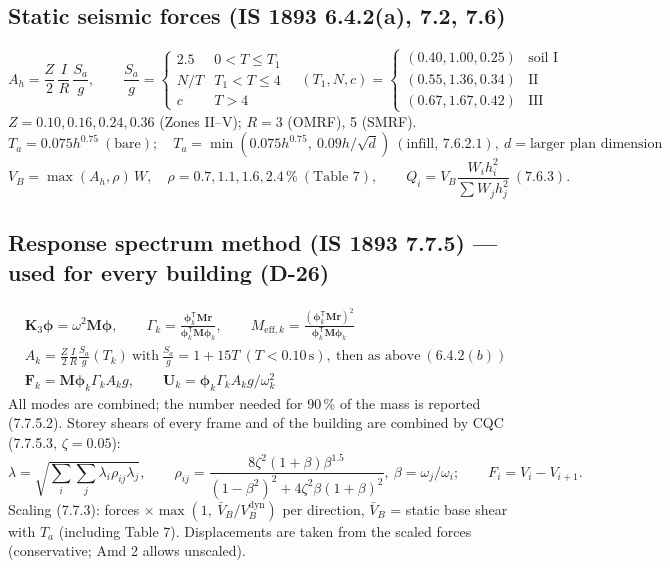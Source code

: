 \documentclass[10pt,a4paper]{article}
\begin{document}
\subsection{Static seismic forces (IS 1893 6.4.2(a), 7.2, 7.6)}
\[
A_h=\frac{Z}{2}\,\frac{I}{R}\,\frac{S_a}{g},\qquad
\frac{S_a}{g}=\begin{cases}2.5 & 0<T\le T_1\\ N/T & T_1<T\le4\\ c & T>4\end{cases}
\quad (T_1,N,c)=\begin{cases}(0.40,1.00,0.25)& \text{soil I}\\(0.55,1.36,0.34)&\text{II}\\(0.67,1.67,0.42)&\text{III}\end{cases}
\]
$Z = 0.10,0.16,0.24,0.36$ (Zones II--V); $R=3$ (OMRF), 5 (SMRF).
\[
T_a=0.075h^{0.75}\ (\text{bare});\quad T_a=\min\!\left(0.075h^{0.75},\ 0.09h/\sqrt d\right)\ (\text{infill, 7.6.2.1}),
\ d=\text{larger plan dimension}
\]
\[
V_B=\max(A_h,\rho)\,W,\quad \rho=0.7,1.1,1.6,2.4\,\%\ (\text{Table 7}),\qquad
Q_i=V_B\frac{W_ih_i^2}{\sum W_jh_j^2}\ (7.6.3).
\]

\subsection{Response spectrum method (IS 1893 7.7.5) --- used for every building (D-26)}
\begin{align*}
&\mathbf K_3\boldsymbol\phi=\omega^2\mathbf M\boldsymbol\phi, \qquad
\Gamma_k=\frac{\boldsymbol\phi_k^{\mathsf T}\mathbf M\mathbf r}{\boldsymbol\phi_k^{\mathsf T}\mathbf M\boldsymbol\phi_k},
\qquad M_{\text{eff},k}=\frac{(\boldsymbol\phi_k^{\mathsf T}\mathbf M\mathbf r)^2}{\boldsymbol\phi_k^{\mathsf T}\mathbf M\boldsymbol\phi_k}\\
&A_k=\frac Z2\frac IR\frac{S_a}{g}(T_k)\ \text{with}\ \frac{S_a}{g}=1+15T\ (T<0.10\,\text{s}),\ \text{then as above}
\ (6.4.2(b))\\
&\mathbf F_k=\mathbf M\boldsymbol\phi_k\Gamma_kA_kg,\qquad \mathbf U_k=\boldsymbol\phi_k\Gamma_kA_kg/\omega_k^2
\end{align*}
All modes are combined; the number needed for 90\,\% of the mass is reported (7.7.5.2). Storey shears of every frame
and of the building are combined by CQC (7.7.5.3, $\zeta=0.05$):
\[
\lambda=\sqrt{\sum_i\sum_j\lambda_i\rho_{ij}\lambda_j},\qquad
\rho_{ij}=\frac{8\zeta^2(1+\beta)\beta^{1.5}}{(1-\beta^2)^2+4\zeta^2\beta(1+\beta)^2},\ \beta=\omega_j/\omega_i;
\qquad F_i=V_i-V_{i+1}.
\]
Scaling (7.7.3): forces $\times\max(1,\ \bar V_B/V_B^{\text{dyn}})$ per direction, $\bar V_B$ = static base shear
with $T_a$ (including Table 7). Displacements are taken from the scaled forces (conservative; Amd 2 allows
unscaled).
\end{document}
